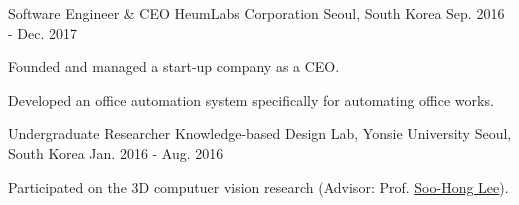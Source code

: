 \begin{cventries}
\cventry
{Software Engineer \& CEO} %
{HeumLabs Corporation} %
{Seoul, South Korea} %
{Sep. 2016 - Dec. 2017} %
{ %
\begin{cvitems}
\item {Founded and managed a start-up company as a CEO.}
\item {Developed an office automation system specifically for automating office works.}
\end{cvitems}
}
\vspace{-.5em}

\cventry
{Undergraduate Researcher} %
{Knowledge-based Design Lab, Yonsie University} %
{Seoul, South Korea} %
{Jan. 2016 - Aug. 2016} %
{ %
\begin{cvitems}
\item {Participated on the 3D computuer vision research (Advisor: Prof. \href{https://kbd.yonsei.ac.kr}{Soo-Hong Lee}).}
\end{cvitems}
}
\vspace{-.5em}



\end{cventries}
